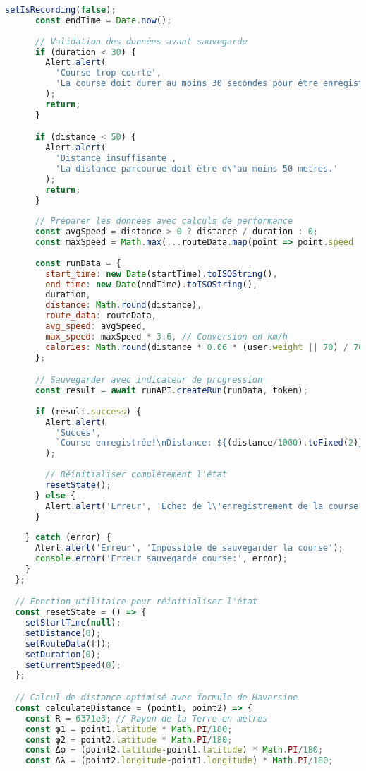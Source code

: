 \begin{lstlisting}[language=javascript, caption=Composant d'enregistrement de course]
      setIsRecording(false);
      const endTime = Date.now();
      
      // Validation des données avant sauvegarde
      if (duration < 30) {
        Alert.alert(
          'Course trop courte', 
          'La course doit durer au moins 30 secondes pour être enregistrée.'
        );
        return;
      }

      if (distance < 50) {
        Alert.alert(
          'Distance insuffisante', 
          'La distance parcourue doit être d\'au moins 50 mètres.'
        );
        return;
      }
      
      // Préparer les données avec calculs de performance
      const avgSpeed = distance > 0 ? distance / duration : 0;
      const maxSpeed = Math.max(...routeData.map(point => point.speed || 0));
      
      const runData = {
        start_time: new Date(startTime).toISOString(),
        end_time: new Date(endTime).toISOString(),
        duration,
        distance: Math.round(distance),
        route_data: routeData,
        avg_speed: avgSpeed,
        max_speed: maxSpeed * 3.6, // Conversion en km/h
        calories: Math.round(distance * 0.06 * (user.weight || 70) / 70) // Estimation basée sur le poids
      };

      // Sauvegarder avec indicateur de progression
      const result = await runAPI.createRun(runData, token);
      
      if (result.success) {
        Alert.alert(
          'Succès', 
          `Course enregistrée!\nDistance: ${(distance/1000).toFixed(2)} km\nDurée: ${formatDuration(duration)}`
        );
        
        // Réinitialiser complètement l'état
        resetState();
      } else {
        Alert.alert('Erreur', 'Échec de l\'enregistrement de la course');
      }
      
    } catch (error) {
      Alert.alert('Erreur', 'Impossible de sauvegarder la course');
      console.error('Erreur sauvegarde course:', error);
    }
  };

  // Fonction utilitaire pour réinitialiser l'état
  const resetState = () => {
    setStartTime(null);
    setDistance(0);
    setRouteData([]);
    setDuration(0);
    setCurrentSpeed(0);
  };

  // Calcul de distance optimisé avec formule de Haversine
  const calculateDistance = (point1, point2) => {
    const R = 6371e3; // Rayon de la Terre en mètres
    const φ1 = point1.latitude * Math.PI/180;
    const φ2 = point2.latitude * Math.PI/180;
    const Δφ = (point2.latitude-point1.latitude) * Math.PI/180;
    const Δλ = (point2.longitude-point1.longitude) * Math.PI/180;


\end{lstlisting}
